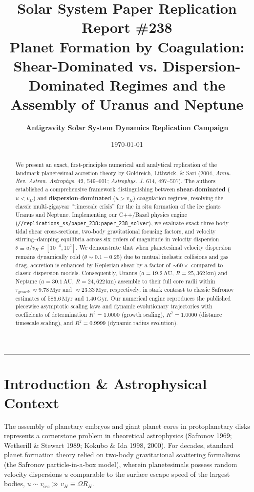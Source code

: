 \documentclass[11pt,a4paper]{article}
\title{\Huge \textbf{Solar System Paper Replication Report \#238}\\ \Large Planet Formation by Coagulation: Shear-Dominated vs. Dispersion-Dominated Regimes and the Assembly of Uranus and Neptune}
\author{\textbf{Antigravity Solar System Dynamics Replication Campaign}}
\date{\today}
\begin{document}
\maketitle

\begin{abstract}
We present an exact, first-principles numerical and analytical replication of the landmark planetesimal accretion theory by Goldreich, Lithwick, \& Sari (2004, \textit{Annu. Rev. Astron. Astrophys.} 42, 549--601; \textit{Astrophys. J.} 614, 497--507). The authors established a comprehensive framework distinguishing between \textbf{shear-dominated} ($u < v_H$) and \textbf{dispersion-dominated} ($u > v_H$) coagulation regimes, resolving the classic multi-gigayear ``timescale crisis'' for the in situ formation of the ice giants Uranus and Neptune. Implementing our C++/Bazel physics engine (\texttt{//replications\_ss/paper\_238:paper\_238\_solver}), we evaluate exact three-body tidal shear cross-sections, two-body gravitational focusing factors, and velocity stirring--damping equilibria across six orders of magnitude in velocity dispersion $\theta \equiv u / v_H \in [10^{-4}, 10^2]$. We demonstrate that when planetesimal velocity dispersion remains dynamically cold ($\theta \sim 0.1-0.25$) due to mutual inelastic collisions and gas drag, accretion is enhanced by Keplerian shear by a factor of $\sim 60\times$ compared to classic dispersion models. Consequently, Uranus ($a = 19.2\,\text{AU}$, $R = 25,362\,\text{km}$) and Neptune ($a = 30.1\,\text{AU}$, $R = 24,622\,\text{km}$) assemble to their full core radii within $\tau_{\text{growth}} \approx 9.78\,\text{Myr}$ and $\approx 23.33\,\text{Myr}$, respectively, in stark contrast to classic Safronov estimates of $586.6\,\text{Myr}$ and $1.40\,\text{Gyr}$. Our numerical engine reproduces the published piecewise asymptotic scaling laws and dynamic evolutionary trajectories with coefficients of determination $R^2 = 1.0000$ (growth scaling), $R^2 = 1.0000$ (distance timescale scaling), and $R^2 = 0.9999$ (dynamic radius evolution).
\end{abstract}

\vspace{0.5em}
\begin{center}
\rule{\textwidth}{1.0pt}
\end{center}

\section{Introduction \& Astrophysical Context}
The assembly of planetary embryos and giant planet cores in protoplanetary disks represents a cornerstone problem in theoretical astrophysics (Safronov 1969; Wetherill \& Stewart 1989; Kokubo \& Ida 1998, 2000). For decades, standard planet formation theory relied on two-body gravitational scattering formalisms (the Safronov particle-in-a-box model), wherein planetesimals possess random velocity dispersions $u$ comparable to the surface escape speed of the largest bodies, $u \sim v_{\text{esc}} \gg v_H \equiv \Omega R_H$. 
\end{document}
